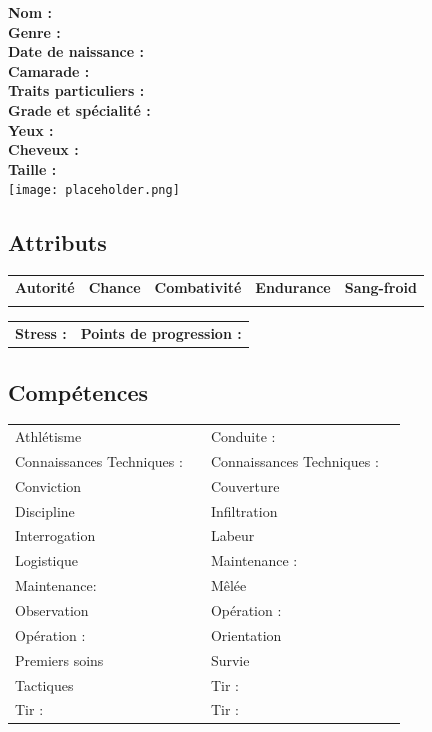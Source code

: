\documentclass{report}
\begin{document}
\begin{multicols}{3}
\textbf{Nom :}\\
\textbf{Genre :}\\\textbf{Date de naissance :}\\
\textbf{Camarade :}\\
\textbf{Traits particuliers :}\\
\columnbreak
\textbf{Grade et spécialité :} \\
\textbf{Yeux :}\\
\textbf{Cheveux :}\\
\textbf{Taille :}\\
\columnbreak
\texttt{[image: placeholder.png]}
\end{multicols}
\noindent\makebox[\linewidth]{\rule{\textwidth}{0.4pt}}


\subsection*{Attributs}
\begin{center}
    \begin{tabular}{c|c|c|c|c}
        \textbf{Autorité} & \textbf{Chance} & \textbf{Combativité} & \textbf{Endurance} & \textbf{Sang-froid} \\
         & & & &\\

    \end{tabular}
\end{center}
\begin{center}
    \begin{tabular}{m{} m{}}
     \textbf{Stress :} & \textbf{Points de progression :}
\end{tabular}
\end{center}
\noindent\makebox[\linewidth]{\rule{\textwidth}{0.4pt}}
\subsection*{Compétences}

\begin{tabular}{p{}| r || p{}| r|}
Athlétisme & &Conduite : & {}\\
Connaissances Techniques : &  &Connaissances Techniques : & {}\\
Conviction &  &Couverture& {}\\
Discipline &  &Infiltration& {}\\
Interrogation & & Labeur& {}\\
Logistique & & Maintenance : & {}\\
Maintenance: & & Mêlée& {}\\
Observation & & Opération : & {}\\
Opération : & & Orientation& {}\\
Premiers soins & & Survie& {}\\
Tactiques & & Tir : & {}\\
Tir : & & Tir : & {}\\

\end{tabular}\\
\noindent\makebox[\linewidth]{\rule{\textwidth}{0.4pt}}
\end{document}
